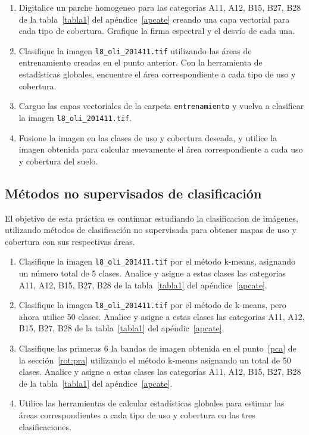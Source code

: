 \documentclass[hidelinks,12pt]{article}
\begin{document}
\begin{enumerate}
    \item Digitalice un parche homogeneo  para las categorias A11, A12, B15, B27, B28 de la
    tabla~\ref{tabla1} del ap\'endice~\ref{apcate} creando una capa vectorial para
    cada tipo de cobertura. Grafique la firma espectral y el desvío de cada una.
    \item Clasifique la imagen \texttt{l8\_oli\_2014\-11.tif} utilizando las
    áreas de entrenamiento creadas en el punto anterior. Con la herramienta
    de estadísticas globales, encuentre el área correspondiente a cada tipo de uso y
    cobertura.
    \item Cargue las capas vectoriales de la carpeta \texttt{entrenamiento} y
        vuelva a clasificar la imagen \texttt{l8\_oli\_2014\-11.tif}.
    \item Fusione la imagen en las clases de uso y cobertura deseada, y utilice la
    imagen obtenida para calcular nuevamente el área correspondiente a cada uso y
    cobertura del suelo.
\end{enumerate}

\subsection{Métodos no supervisados de clasificación}
El objetivo de esta práctica es continuar estudiando la clasificacion de imágenes, utilizando métodos de clasificación no supervisada para obtener
mapas de uso y cobertura con sus respectivas áreas.

\begin{enumerate}
    \item Clasifique la imagen \texttt{l8\_oli\_2014\-11.tif} por el método
        k-means, asignando un número total
        de 5 clases. Analice y asigne a estas clases las categorias A11, A12,
        B15, B27, B28 de la tabla~\ref{tabla1} del ap\'endice~\ref{apcate}.
    \item Clasifique la imagen \texttt{l8\_oli\_2014\-11.tif} por el método de
        k-means, pero ahora utilice 50
        clases. Analice y asigne a estas clases las categorias A11, A12,
        B15, B27, B28 de la tabla~\ref{tabla1} del ap\'endic~\ref{apcate}.
    \item Clasifique las primeras 6 la bandas de imagen obtenida en el punto~\ref{pca}
        de la secci\'on~\ref{rot:pra} utilizando el m\'etodo k-means
        asignando un total de 50 clases. Analice y asigne a estas clases las categorias A11, A12,
        B15, B27, B28 de la tabla~\ref{tabla1} del ap\'endice~\ref{apcate}.
    \item Utilice las herramientas de calcular estadísticas globales para
        estimar las áreas correspondientes a cada tipo de uso y cobertura en
        las tres clasificaciones.
\end{enumerate}
\end{document}
